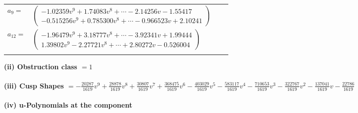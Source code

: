 \documentclass[1p]{elsarticle_modified}
\theoremstyle{definition}
\begin{document}
\begin{tabular}{m{7pt} m{180pt} m{7pt} m{180pt} }
\flushright $a_{9}=$&$\begin{pmatrix}-1.02359 v^{9}+1.74083 v^{8}+\cdots-2.14256 v-1.55417\\-0.515256 v^{9}+0.785300 v^{8}+\cdots-0.966523 v+2.10241\end{pmatrix}$ \\
\flushright $a_{12}=$&$\begin{pmatrix}-1.96479 v^{9}+3.18777 v^{8}+\cdots-3.92341 v+1.99444\\1.39802 v^{9}-2.27721 v^{8}+\cdots+2.80272 v-0.526004\end{pmatrix}$\\&\end{tabular}
\flushleft \textbf{(ii) Obstruction class $= 1$}\\~\\
\flushleft \textbf{(iii) Cusp Shapes $= -\frac{20287}{1619} v^9+\frac{28878}{1619} v^8+\frac{30807}{1619} v^7+\frac{368475}{1619} v^6-\frac{403029}{1619} v^5-\frac{583117}{1619} v^4-\frac{710653}{1619} v^3-\frac{322767}{1619} v^2-\frac{137041}{1619} v-\frac{22786}{1619}$}\\~\\
\newpage\renewcommand{\arraystretch}{1}
\flushleft \textbf{(iv) u-Polynomials at the component}\newline \\
\end{document}
